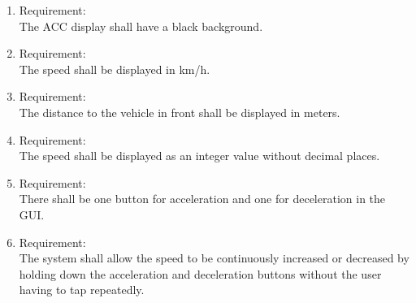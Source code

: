 \begin{enumerate}[label*=\arabic*.]
 	\item \label{req.1}  Requirement: \\
	 	The ACC display shall have a black background.  \\

        \item \label{req.2} Requirement: \\
        The speed shall be displayed in km/h.  \\
	 	\item \label{req.3} Requirement: \\
        The distance to the vehicle in front shall be displayed in meters. \\
        \item \label{req.4} Requirement: \\
        The speed shall be displayed as an integer value without decimal places. \\
        \item \label{req.5} Requirement: \\
        There shall be one button for acceleration and one for deceleration in the GUI. \\
        \item \label{req.6} Requirement: \\
        The system shall allow the speed to be continuously increased or decreased by holding down the acceleration and deceleration buttons without the user having to tap repeatedly. \\

        
	 \end{enumerate}

